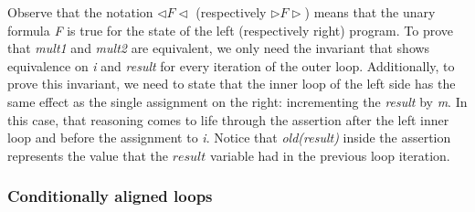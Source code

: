 Observe that the notation $\lhd F \lhd$ (respectively $\rhd F \rhd$) means that the unary formula \emph{F} is true for the state of the left (respectively right) program.
To prove that \emph{mult1} and \emph{mult2} are equivalent, we only need the invariant that shows equivalence on \emph{i} and \emph{result} for every iteration of the outer loop.
Additionally, to prove this invariant, we need to state that the inner loop of the left side has the same effect as the single assignment on the right: incrementing the \emph{result} by \emph{m}.
In this case, that reasoning comes to life through the assertion after the left inner loop and before the assignment to \emph{i}.
Notice that \emph{old(result)} inside the assertion represents the value that the $result$ variable had in the previous loop iteration.


\FloatBarrier
\subsubsection{Conditionally aligned loops}
\label{subsubsec:cond_align_loops_example}


